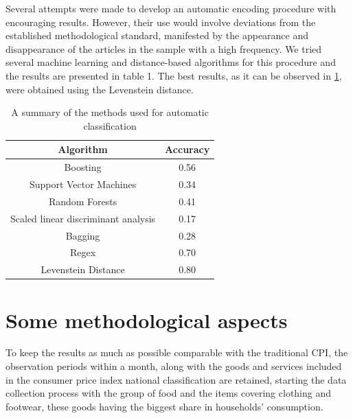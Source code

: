 \documentclass[]{article}
\begin{document}
Several attempts were made to develop an automatic encoding procedure with encouraging results. However, their use 
would involve deviations from the established methodological standard, manifested by the appearance and disappearance 
of the articles in the sample with a high frequency. We tried several machine learning and distance-based algorithms 
for this procedure and the results are presented in table 1. The best results, as it can be observed in \ref{table:1}, 
were obtained using the Levenstein distance.


\begin{table}[h!]
\centering
\begin{tabular}{| c| c| }
	\hline
	Algorithm & Accuracy \\
	\hline  
	Boosting & 0.56 \\  
	Support Vector Machines & 0.34 \\
	Random Forests &  0.41 \\
	Scaled linear discriminant analysis & 0.17 \\
	Bagging & 0.28 \\
	Regex & 0.70 \\
	Levenstein Distance & 0.80 \\
	\hline
\end{tabular}
\caption{A summary of the methods used for automatic classification}
\label{table:1}
\end{table}

\section{Some methodological aspects}\label{methodology}

To keep the results as much as possible comparable with the traditional CPI, the observation periods within a month, 
along with the goods and services included in the consumer price index national classification are retained, starting 
the data collection process with the group of food and the items covering clothing and footwear, these goods 
having the biggest share in households’ consumption. 
\end{document}
